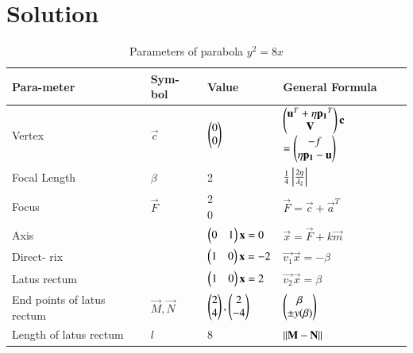\documentclass[journal,12pt,twocolumn]{IEEEtran}
\begin{document}
\section{Solution}
\begin{table}[!ht]
\begin{center}
\begin{tabular}{ | m{1.4cm} | m{1.0cm}| m{2.4cm} | m{2.3cm} | } 
\hline
Para-\newline meter  & Sym-\newline bol  & Value  & General \newline Formula\\ 
\hline
Vertex & $\vec{c}$ & $\begin{pmatrix}0\\0\end{pmatrix}$ & $\begin{pmatrix}\mathbf{u}^T + \eta\mathbf{p_1}^T \\ \mathbf{V}\end{pmatrix}\mathbf{c}$ \newline $= \begin{pmatrix}-f \\ \eta\mathbf{p_1} - \mathbf{u}\end{pmatrix}$ \\ 
\hline
Focal \newline Length & $\beta$ & 2 & $\frac{1}{4}\left\vert\frac{2\eta}{\lambda_2}\right\vert$
\\ 
\hline
Focus & $\vec{F}$ & \myvec{2\\0} & $\vec{F}=\vec{c} + \vec{a}^T$ \\
\hline
Axis &  & $\begin{pmatrix}0 & 1\end{pmatrix}\mathbf{x}=0$ & $\vec{x}=\vec{F}+k\vec{m}$ \\
\hline
Direct- \newline rix & & $\begin{pmatrix}1 & 0\end{pmatrix}\mathbf{x} = -2$ & $\vec{v_1}\vec{x} = -\beta$ \\
\hline
Latus \newline rectum & & $\begin{pmatrix}1 & 0\end{pmatrix}\mathbf{x}=2$ & $\vec{v_2}\vec{x}=\beta$\\
\hline
End \newline points \newline of latus \newline rectum & $\vec{M},\vec{N}$ & $\begin{pmatrix}2\\4\end{pmatrix},\begin{pmatrix}2\\-4\end{pmatrix}$ & $\begin{pmatrix}\beta \\ \pm y(\beta)\end{pmatrix}$ \\
\hline
Length \newline of latus \newline rectum & $l$ & 8 & $\left\lVert\mathbf{M}-\mathbf{N}\right\rVert$\\
\hline
\end{tabular}
\end{center}
\caption{Parameters of parabola $y^2=8x$}
\label{tab:table1}
\end{table}
\end{document}
